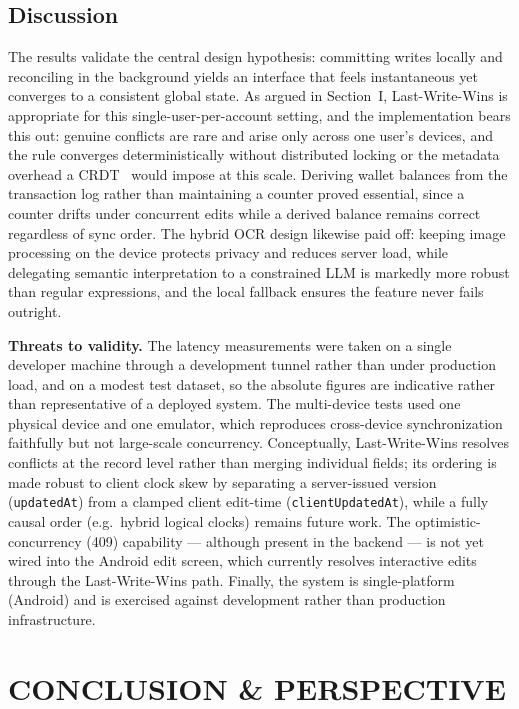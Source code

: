 \documentclass[13pt,a4paper]{extarticle}
\begin{document}
\subsection{Discussion}
The results validate the central design hypothesis: committing writes locally and reconciling in the
background yields an interface that feels instantaneous yet converges to a consistent global state.
As argued in Section~I, Last-Write-Wins is appropriate for this single-user-per-account setting, and
the implementation bears this out: genuine conflicts are rare and arise only across one user's
devices, and the rule converges deterministically without distributed locking or the metadata
overhead a CRDT~\cite{crdt} would impose at this scale. Deriving wallet balances from the transaction log rather than maintaining a
counter proved essential, since a counter drifts under concurrent edits while a derived balance
remains correct regardless of sync order. The hybrid OCR design likewise paid off: keeping image
processing on the device protects privacy and reduces server load, while delegating semantic
interpretation to a constrained LLM is markedly more robust than regular expressions, and the local
fallback ensures the feature never fails outright.

\noindent\textbf{Threats to validity.} The latency measurements were taken on a single developer
machine through a development tunnel rather than under production load, and on a modest test dataset,
so the absolute figures are indicative rather than representative of a deployed system. The
multi-device tests used one physical device and one emulator, which reproduces cross-device
synchronization faithfully but not large-scale concurrency. Conceptually, Last-Write-Wins resolves
conflicts at the record level rather than merging individual fields; its ordering is made robust to
client clock skew by separating a server-issued version (\texttt{updatedAt}) from a clamped client
edit-time (\texttt{clientUpdatedAt}), while a fully causal order (e.g.\ hybrid logical clocks) remains
future work. The optimistic-concurrency (409) capability --- although present in the backend --- is
not yet wired into the Android edit screen, which currently resolves interactive edits through the
Last-Write-Wins path. Finally, the system is single-platform (Android) and is exercised against
development rather than production infrastructure.

\section{CONCLUSION \& PERSPECTIVE}
\end{document}

